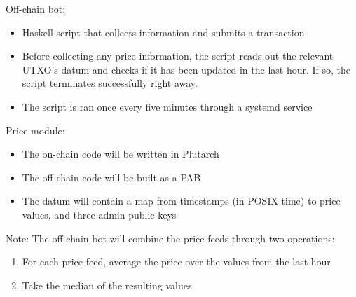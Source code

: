 \documentclass{article} %
\begin{document}
Off-chain bot:
\begin{itemize}
  \item Haskell script that collects information and submits a transaction
  \item Before collecting any price information, the script reads out the
    relevant UTXO's datum and checks if it has been updated in the last hour. If
    so, the script terminates successfully right away.
  \item The script is ran once every five minutes through a systemd service
\end{itemize}

Price module:
\begin{itemize}
  \item The on-chain code will be written in Plutarch
  \item The off-chain code will be built as a PAB
  \item The datum will contain a map from timestamps (in POSIX time) to price
    values, and three admin public keys
\end{itemize}

Note: The off-chain bot will combine the price feeds through two operations:
\begin{enumerate}
  \item For each price feed, average the price over the values from the last
    hour
  \item Take the median of the resulting values
\end{enumerate}

% 
% 
% 
% 
% 
% 
\end{document}
